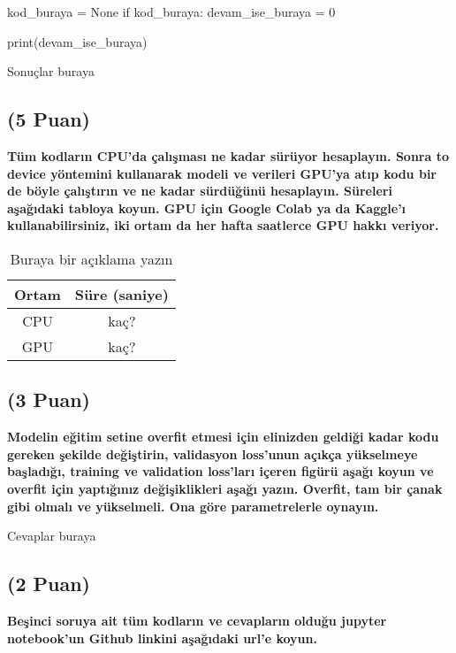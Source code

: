 \documentclass[11pt]{article}
\begin{document}
\begin{python}
kod_buraya = None
if kod_buraya:
    devam_ise_buraya = 0

print(devam_ise_buraya)
\end{python}

Sonuçlar buraya

\subsection{(5 Puan)} \textbf{Tüm kodların CPU'da çalışması ne kadar sürüyor hesaplayın. Sonra to device yöntemini kullanarak modeli ve verileri GPU'ya atıp kodu bir de böyle çalıştırın ve ne kadar sürdüğünü hesaplayın. Süreleri aşağıdaki tabloya koyun. GPU için Google Colab ya da Kaggle'ı kullanabilirsiniz, iki ortam da her hafta saatlerce GPU hakkı veriyor.}

\begin{table}[ht!]
    \centering
    \caption{Buraya bir açıklama yazın}
    \begin{tabular}{c|c}
        Ortam & Süre (saniye) \\\hline
        CPU & kaç? \\
        GPU & kaç?\\
    \end{tabular}
    \label{tab:my_table}
\end{table}

\subsection{(3 Puan)} \textbf{Modelin eğitim setine overfit etmesi için elinizden geldiği kadar kodu gereken şekilde değiştirin, validasyon loss'unun açıkça yükselmeye başladığı, training ve validation loss'ları içeren figürü aşağı koyun ve overfit için yaptığınız değişiklikleri aşağı yazın. Overfit, tam bir çanak gibi olmalı ve yükselmeli. Ona göre parametrelerle oynayın.}

Cevaplar buraya

\begin{comment}
\begin{figure}[ht!]
    \centering
    \texttt{[image: mypicturehere.png]}
    \caption{Buraya açıklama yazın}
    \label{fig:my_pic}
\end{figure}
\end{comment}

\subsection{(2 Puan)} \textbf{Beşinci soruya ait tüm kodların ve cevapların olduğu jupyter notebook'un Github linkini aşağıdaki url'e koyun.}
\end{document}
